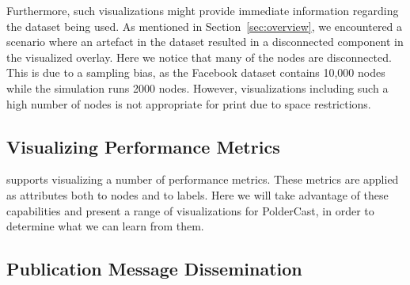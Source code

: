 Furthermore, such visualizations might provide immediate information
regarding the dataset being used. As mentioned in
Section~\ref{sec:overview}, we encountered a scenario where an artefact
in the dataset resulted in a disconnected component in the visualized
overlay. Here we notice that many of the nodes are disconnected. This is
due to a sampling bias, as the Facebook dataset contains 10,000 nodes
while the simulation runs 2000 nodes. However, visualizations including
such a high number of nodes is not appropriate for print due to space
restrictions.

\subsection{Visualizing Performance Metrics}

\demo{} supports visualizing a number of performance metrics. These
metrics are applied as attributes both to nodes and to labels. Here we
will take advantage of these capabilities and present a range of
visualizations for PolderCast, in order to determine what we can learn
from them.

\subsection{Publication Message Dissemination}
\label{sec:dissviz}

